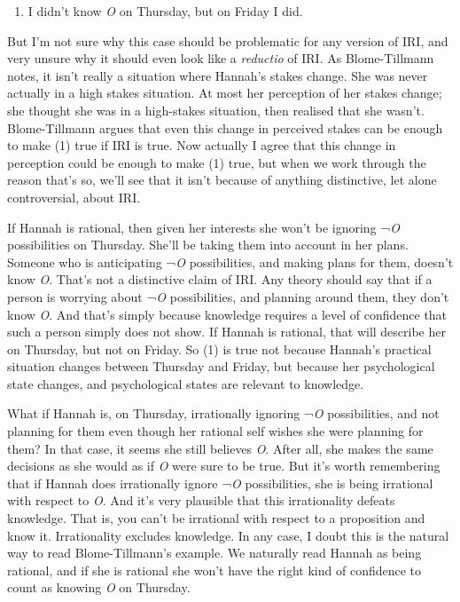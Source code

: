 \documentclass[
  10pt,
  letterpaper,
  DIV=11,
  numbers=noendperiod,
  twoside]{scrartcl}
\providecommand{\tightlist}{%
  \setlength{\itemsep}{0pt}\setlength{\parskip}{0pt}}\usepackage{longtable,booktabs,array}
\begin{document}
\begin{enumerate}
\def\labelenumi{(\arabic{enumi})}
\tightlist
\item
  I didn't know \emph{O} on Thursday, but on Friday I did.
\end{enumerate}

But I'm not sure why this case should be problematic for any version of
IRI, and very unsure why it should even look like a \emph{reductio} of
IRI. As Blome-Tillmann notes, it isn't really a situation where Hannah's
stakes change. She was never actually in a high stakes situation. At
most her perception of her stakes change; she thought she was in a
high-stakes situation, then realised that she wasn't. Blome-Tillmann
argues that even this change in perceived stakes can be enough to make
(1) true if IRI is true. Now actually I agree that this change in
perception could be enough to make (1) true, but when we work through
the reason that's so, we'll see that it isn't because of anything
distinctive, let alone controversial, about IRI.

If Hannah is rational, then given her interests she won't be ignoring
¬\emph{O} possibilities on Thursday. She'll be taking them into account
in her plans. Someone who is anticipating ¬\emph{O} possibilities, and
making plans for them, doesn't know \emph{O}. That's not a distinctive
claim of IRI. Any theory should say that if a person is worrying about
¬\emph{O} possibilities, and planning around them, they don't know
\emph{O}. And that's simply because knowledge requires a level of
confidence that such a person simply does not show. If Hannah is
rational, that will describe her on Thursday, but not on Friday. So (1)
is true not because Hannah's practical situation changes between
Thursday and Friday, but because her psychological state changes, and
psychological states are relevant to knowledge.

What if Hannah is, on Thursday, irrationally ignoring ¬\emph{O}
possibilities, and not planning for them even though her rational self
wishes she were planning for them? In that case, it seems she still
believes \emph{O}. After all, she makes the same decisions as she would
as if \emph{O} were sure to be true. But it's worth remembering that if
Hannah does irrationally ignore ¬\emph{O} possibilities, she is being
irrational with respect to \emph{O}. And it's very plausible that this
irrationality defeats knowledge. That is, you can't be irrational with
respect to a proposition and know it. Irrationality excludes knowledge.
In any case, I doubt this is the natural way to read Blome-Tillmann's
example. We naturally read Hannah as being rational, and if she is
rational she won't have the right kind of confidence to count as knowing
\emph{O} on Thursday.
\end{document}
